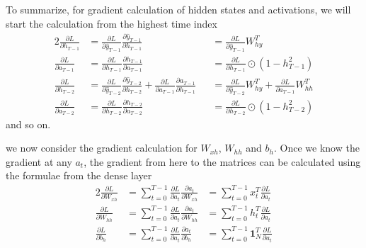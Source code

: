 \documentclass[../../deep_learning_notes.tex]{subfiles}
\begin{document}
To summarize, for gradient calculation of hidden states and activations, we will start the calculation from the highest time index
\begin{alignat*}{2}
    \frac{\partial{L}}{\partial{h_{T-1}}} &= \frac{\partial{L}}{\partial{\hat{y}_{T-1}}} \frac{\partial{\hat{y}_{T-1}}}{\partial{h_{T-1}}} &&= \frac{\partial{L}}{\partial{\hat{y}_{T-1}}} W_{hy}^{T}\\
    \frac{\partial{L}}{\partial{a_{T-1}}} &= \frac{\partial{L}}{\partial{h_{T-1}}} \frac{\partial{h_{T-1}}}{\partial{a_{T-1}}} &&= \frac{\partial{L}}{\partial{h_{T-1}}} \odot (1 - h_{T-1}^{2})\\
    \frac{\partial{L}}{\partial{h_{T-2}}} &= \frac{\partial{L}}{\partial{\hat{y}_{T-2}}} \frac{\partial{\hat{y}_{T-2}}}{\partial{h_{T-2}}} + \frac{\partial{L}}{\partial{a_{T-1}}}\frac{\partial{a_{T-1}}}{\partial{h_{T-1}}}
     &&= \frac{\partial{L}}{\partial{\hat{y}_{T-2}}} W_{hy}^{T} + \frac{\partial{L}}{\partial{a_{T-1}}} W_{hh}^{T}\\
    \frac{\partial{L}}{\partial{a_{T-2}}} &= \frac{\partial{L}}{\partial{h_{T-2}}} \frac{\partial{h_{T-2}}}{\partial{a_{T-2}}} &&= \frac{\partial{L}}{\partial{h_{T-2}}} \odot (1 - h_{T-2}^{2})
\end{alignat*}
and so on.\newline

we now consider the gradient calculation for $W_{xh}$, $W_{hh}$ and $b_{h}$. Once we know the gradient at any $a_{t}$, the gradient from here to the matrices can be calculated using the formulae from the dense layer
\begin{alignat*}{2}
    \frac{\partial{L}}{\partial{W_{xh}}} &= \sum_{t=0}^{T-1} \frac{\partial{L}}{\partial{a_{t}}} \frac{\partial{a_{t}}}{\partial{W_{xh}}} &=  \sum_{t=0}^{T-1} x_{t}^{T} \frac{\partial{L}}{\partial{a_{t}}}\\
    \frac{\partial{L}}{\partial{W_{hh}}} &= \sum_{t=0}^{T-1} \frac{\partial{L}}{\partial{a_{t}}} \frac{\partial{a_{t}}}{\partial{W_{hh}}} &=  \sum_{t=0}^{T-1} h_{t}^{T} \frac{\partial{L}}{\partial{a_{t}}}\\
    \frac{\partial{L}}{\partial{b_{h}}} &= \sum_{t=0}^{T-1} \frac{\partial{L}}{\partial{a_{t}}} \frac{\partial{a_{t}}}{\partial{b_{h}}} &=  \sum_{t=0}^{T-1} \mathbf{1}_{N}^{T} \frac{\partial{L}}{\partial{a_{t}}}
\end{alignat*}
\end{document}
